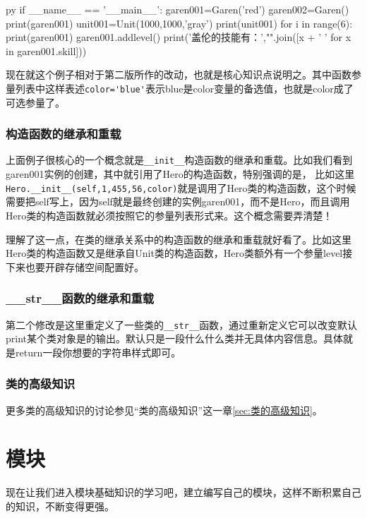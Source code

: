 \documentclass[12pt,oneside]{book}
\begin{document}
\begin{common-format}
\begin{xverbatim}[129]{py}
if __name__ == '__main__':
    garen001=Garen('red')
    garen002=Garen()
    print(garen001)
    unit001=Unit(1000,1000,'gray')
    print(unit001)
    for i in range(6):
        print(garen001)
        garen001.addlevel()
    print('盖伦的技能有：',"".join([x + '  ' for x in garen001.skill]))
\end{xverbatim}
现在就这个例子相对于第二版所作的改动，也就是核心知识点说明之。其中函数参量列表中这样表述\verb+color='blue'+表示blue是color变量的备选值，也就是color成了可选参量了。


\subsection{构造函数的继承和重载}
上面例子很核心的一个概念就是\verb+__init__+构造函数的继承和重载。比如我们看到garen001实例的创建，其中就引用了Hero的构造函数，特别强调的是， 比如这里\\
\verb+Hero.__init__(self,1,455,56,color)+就是调用了Hero类的构造函数，这个时候需要把self写上，因为self就是最终创建的实例garen001，而不是Hero，而且调用Hero类的构造函数就必须按照它的参量列表形式来。这个概念需要弄清楚！

理解了这一点，在类的继承关系中的构造函数的继承和重载就好看了。比如这里Hero类的构造函数又是继承自Unit类的构造函数，Hero类额外有一个参量level接下来也要开辟存储空间配置好。

\subsection{\_\_str\_\_{}函数的继承和重载}
第二个修改是这里重定义了一些类的\verb+__str__+函数，通过重新定义它可以改变默认print某个类对象是的输出。默认只是一段什么什么类并无具体内容信息。具体就是return一段你想要的字符串样式即可。




\subsection{类的高级知识}
更多类的高级知识的讨论参见“类的高级知识”这一章\ref{sec:类的高级知识}。





\chapter{模块}
现在让我们进入模块基础知识的学习吧，建立编写自己的模块，这样不断积累自己的知识，不断变得更强。


\end{common-format}
\end{document}
